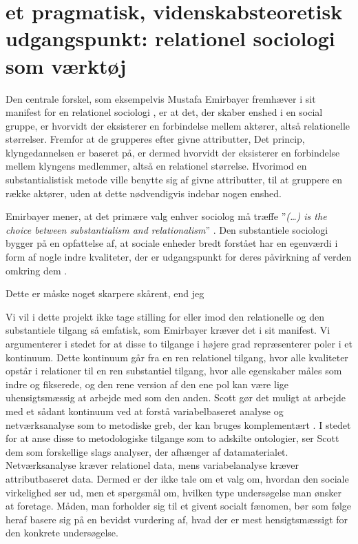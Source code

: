 


\section{et pragmatisk, videnskabsteoretisk udgangspunkt: relationel sociologi som værktøj \label{videnskabsteori} }

Den centrale forskel, som eksempelvis Mustafa Emirbayer fremhæver i sit manifest for en relationel sociologi \citeyear{Emirbayer1997}, er at det, der skaber enshed i en social gruppe, er hvorvidt der eksisterer en forbindelse mellem aktører, altså relationelle størrelser. Fremfor at de grupperes efter givne attributter,
Det princip, klyngedannelsen er baseret på, er dermed hvorvidt der eksisterer en forbindelse mellem klyngens medlemmer, altså en relationel størrelse. Hvorimod en substantialistisk metode ville benytte sig af givne attributter, til at gruppere en række aktører, uden at dette nødvendigvis indebar nogen enshed. 

Emirbayer mener, at det primære valg enhver sociolog må træffe ”\emph{(…) is the choice between substantialism and relationalism}” \parencite[282]{Emirbayer1997}. Den substantiele sociologi bygger på en opfattelse af, at sociale enheder bredt forstået har en egenværdi i form af nogle indre kvaliteter, der er udgangspunkt for deres påvirkning af verden omkring dem \parencite[282f]{Emirbayer1997}. 

Dette er måske noget skarpere skårent, end jeg 

Vi vil i dette projekt ikke tage stilling for eller imod den relationelle og den substantiele tilgang så emfatisk, som Emirbayer kræver det i sit manifest. Vi argumenterer i stedet for at disse to tilgange i højere grad repræsenterer poler i et kontinuum. Dette kontinuum går fra en ren relationel tilgang, hvor alle kvaliteter opstår i relationer til en ren substantiel tilgang, hvor alle egenskaber måles som indre og fikserede, og den rene version af den ene pol kan være lige uhensigtsmæssig at arbejde med som den anden. 
Scott gør det muligt at arbejde med et sådant kontinuum ved at forstå variabelbaseret analyse og netværksanalyse som to metodiske greb, der kan bruges komplementært \parencite[3ff]{Scott2000}. I stedet for at anse disse to metodologiske tilgange som to adskilte ontologier, ser Scott dem som forskellige slags analyser, der afhænger af datamaterialet. Netværksanalyse kræver relationel data, mens variabelanalyse kræver attributbaseret data. Dermed er der ikke tale om et valg om, hvordan den sociale virkelighed ser ud, men et spørgsmål om, hvilken type undersøgelse man ønsker at foretage. Måden, man forholder sig til et givent socialt fænomen, bør som følge heraf basere sig på en bevidst vurdering af, hvad der er mest hensigtsmæssigt for den konkrete undersøgelse.






